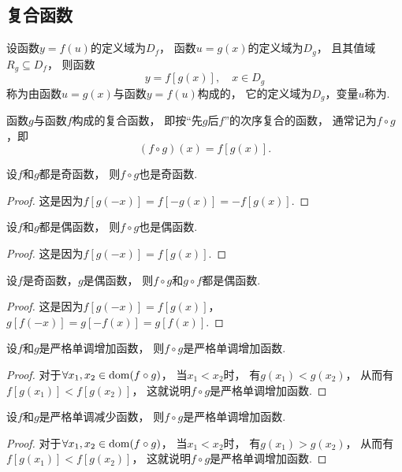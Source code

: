 \subsection{复合函数}
\begin{definition}
设函数\(y=f(u)\)的定义域为\(D_f\)，
函数\(u=g(x)\)的定义域为\(D_g\)，
且其值域\(R_g \subseteq D_f\)，
则函数\[
	y = f[g(x)],
	\quad x \in D_g
\]
称为由函数\(u=g(x)\)与函数\(y=f(u)\)构成的，
它的定义域为\(D_g\)，变量\(u\)称为.

函数\(g\)与函数\(f\)构成的复合函数，
即按“先\(g\)后\(f\)”的次序复合的函数，
通常记为\(f \circ g\)，即\[
	(f \circ g)(x) = f[g(x)].
\]
\end{definition}

\begin{proposition}
设\(f\)和\(g\)都是奇函数，
则\(f \circ g\)也是奇函数.
\begin{proof}
这是因为\(f[g(-x)]
= f[-g(x)]
= -f[g(x)]\).
\end{proof}
\end{proposition}

\begin{proposition}
设\(f\)和\(g\)都是偶函数，
则\(f \circ g\)也是偶函数.
\begin{proof}
这是因为\(f[g(-x)]
= f[g(x)]\).
\end{proof}
\end{proposition}

\begin{proposition}
设\(f\)是奇函数，\(g\)是偶函数，
则\(f \circ g\)和\(g \circ f\)都是偶函数.
\begin{proof}
这是因为\(f[g(-x)]
= f[g(x)]\)，
\(g[f(-x)]
= g[-f(x)]
= g[f(x)]\).
\end{proof}
\end{proposition}

\begin{proposition}
设\(f\)和\(g\)是严格单调增加函数，
则\(f \circ g\)是严格单调增加函数.
\begin{proof}
对于\(\forall x_1,x_2 \in \operatorname{dom}(f \circ g)\)，
当\(x_1 < x_2\)时，
有\(g(x_1) < g(x_2)\)，
从而有\(f[g(x_1)] < f[g(x_2)]\)，
这就说明\(f \circ g\)是严格单调增加函数.
\end{proof}
\end{proposition}

\begin{proposition}\label{theorem:函数.两个严格单调减少函数的复合严格单调增加}
设\(f\)和\(g\)是严格单调减少函数，
则\(f \circ g\)是严格单调增加函数.
\begin{proof}
对于\(\forall x_1,x_2 \in \operatorname{dom}(f \circ g)\)，
当\(x_1 < x_2\)时，
有\(g(x_1) > g(x_2)\)，
从而有\(f[g(x_1)] < f[g(x_2)]\)，
这就说明\(f \circ g\)是严格单调增加函数.
\end{proof}
\end{proposition}

